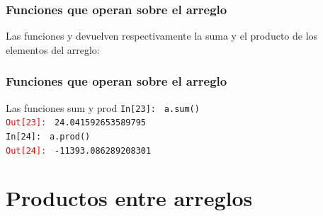 \begin{frame}[fragile]
\frametitle{Funciones que operan sobre el arreglo}
Las funciones  y  devuelven respectivamente la suma y el producto de los elementos del arreglo:
\end{frame}
\begin{frame}[fragile]
\frametitle{Funciones que operan sobre el arreglo}
\fontsize{10}{10}\selectfont
\begin{exampleblock}{Las funciones sum y prod}
\textcolor{ao}{\texttt{In[23]: }} \texttt{a.sum()} \\ 
\medskip
\pause
\textcolor{red}{\texttt{Out[23]: }} \texttt{24.041592653589795} \\
\medskip
\pause
\textcolor{ao}{\texttt{In[24]: }} \texttt{a.prod()} \\ 
\medskip
\pause
\textcolor{red}{\texttt{Out[24]: }} \texttt{-11393.086289208301}
\end{exampleblock}
\end{frame}
\section{Productos entre arreglos}
